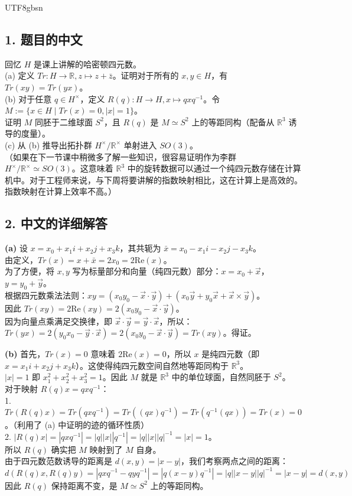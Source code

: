 \documentclass{article}
\begin{document}
\begin{CJK*}{UTF8}{gbsn}
\subsection*{1. 题目的中文}
回忆 $H$ 是课上讲解的哈密顿四元数。\\
(a) 定义 $Tr: H \to \mathbb{R}, z \mapsto z + \bar{z}$。证明对于所有的 $x, y \in H$，有 $Tr(xy) = Tr(yx)$。\\
(b) 对于任意 $q \in H^\times$，定义 $R(q): H \to H, x \mapsto qxq^{-1}$。令 $M := \{x \in H \mid Tr(x) = 0, |x| = 1\}$。\\
证明 $M$ 同胚于二维球面 $S^2$，且 $R(q)$ 是 $M \simeq S^2$ 上的等距同构（配备从 $\mathbb{R}^3$ 诱导的度量）。\\
(c) 从 (b) 推导出拓扑群 $H^\times / \mathbb{R}^\times$ 单射进入 $SO(3)$。\\
（如果在下一节课中稍微多了解一些知识，很容易证明作为李群 $H^\times / \mathbb{R}^\times \simeq SO(3)$。这意味着 $\mathbb{R}^3$ 中的旋转数据可以通过一个纯四元数存储在计算机中。对于工程师来说，与下周将要讲解的指数映射相比，这在计算上是高效的。指数映射在计算上效率不高。）

\subsection*{2. 中文的详细解答}
\textbf{(a)} 设 $x = x_0 + x_1 i + x_2 j + x_3 k$，其共轭为 $\bar{x} = x_0 - x_1 i - x_2 j - x_3 k$。\\
由定义，$Tr(x) = x + \bar{x} = 2x_0 = 2\text{Re}(x)$。\\
为了方便，将 $x, y$ 写为标量部分和向量（纯四元数）部分：$x = x_0 + \vec{x}$，$y = y_0 + \vec{y}$。\\
根据四元数乘法法则：$xy = (x_0 y_0 - \vec{x} \cdot \vec{y}) + (x_0 \vec{y} + y_0 \vec{x} + \vec{x} \times \vec{y})$。\\
因此 $Tr(xy) = 2\text{Re}(xy) = 2(x_0 y_0 - \vec{x} \cdot \vec{y})$。\\
因为向量点乘满足交换律，即 $\vec{x} \cdot \vec{y} = \vec{y} \cdot \vec{x}$，所以：\\
$Tr(yx) = 2(y_0 x_0 - \vec{y} \cdot \vec{x}) = 2(x_0 y_0 - \vec{x} \cdot \vec{y}) = Tr(xy)$。得证。

\textbf{(b)} 首先，$Tr(x) = 0$ 意味着 $2\text{Re}(x) = 0$，所以 $x$ 是纯四元数（即 $x = x_1 i + x_2 j + x_3 k$）。这使得纯四元数空间自然地等距同构于 $\mathbb{R}^3$。\\
$|x| = 1$ 即 $x_1^2 + x_2^2 + x_3^2 = 1$。因此 $M$ 就是 $\mathbb{R}^3$ 中的单位球面，自然同胚于 $S^2$。\\
对于映射 $R(q)x = qxq^{-1}$：\\
1. $Tr(R(q)x) = Tr(q x q^{-1}) = Tr((qx)q^{-1}) = Tr(q^{-1}(qx)) = Tr(x) = 0$。（利用了 (a) 中证明的迹的循环性质）\\
2. $|R(q)x| = |qxq^{-1}| = |q| |x| |q^{-1}| = |q| |x| |q|^{-1} = |x| = 1$。\\
所以 $R(q)$ 确实把 $M$ 映射到了 $M$ 自身。\\
由于四元数范数诱导的距离是 $d(x, y) = |x - y|$，我们考察两点之间的距离：
$$ d(R(q)x, R(q)y) = |qxq^{-1} - qyq^{-1}| = |q(x - y)q^{-1}| = |q| |x-y| |q|^{-1} = |x-y| = d(x, y) $$
因此 $R(q)$ 保持距离不变，是 $M \simeq S^2$ 上的等距同构。


\end{CJK*}
\end{document}
